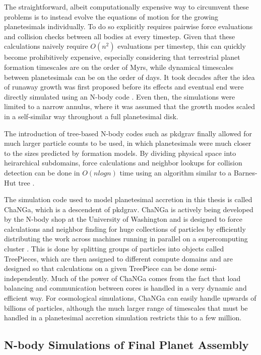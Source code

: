 The straightforward, albeit computationally expensive way to circumvent these problems is to instead evolve the equations of motion for the growing planetesimals individually. To do so explicitly requires pairwise force evaluations and collision checks between all bodies at every timestep. Given that these calculations naively require $O(n^2)$ evaluations per timestep, this can quickly become prohibitively expensive, especially considering that terrestrial planet formation timescales are on the order of Myrs, while dynamical timescales between planetesimals can be on the order of days. It took decades after the idea of runaway growth was first proposed before its effects and eventual end were directly simulated using an N-body code \cite{kokubo96, kokubo98}. Even then, the simulations were limited to a narrow annulus, where it was assumed that the growth modes scaled in a self-similar way throughout a full planetesimal disk.

The introduction of tree-based N-body codes such as {\sc pkdgrav} \cite{richardson00, stadel01, wadsley04} finally allowed for much larger particle counts to be used, in which planetesimals were much closer to the sizes predicted by formation models. By dividing physical space into heirarchical subdomains, force calculations and neighbor lookups for collision detection can be done in $O (n log n)$ time using an algorithm similar to a Barnes-Hut tree \cite{barnes86}. 

The simulation code used to model planetesimal accretion in this thesis is called {\sc ChaNGa}, which is a descendent of {\sc pkdgrav}. {\sc ChaNGa} is actively being developed by the N-body shop at the University of Washington and is designed to force calculations and neighbor finding for huge collections of particles by efficiently distributing the work across machines running in parallel on a supercomputing cluster \cite{jetley08, menon15}. This is done by splitting groups of particles into objects called TreePieces, which are then assigned to different compute domains and are designed so that calculations on a given TreePiece can be done semi-independently. Much of the power of {\sc ChaNGa} comes from the fact that load balancing and communication between cores is handled in a very dynamic and efficient way. For cosmological simulations, {\sc ChaNGa} can easily handle upwards of billions of particles, although the much larger range of timescales that must be handled in a planetesimal accretion simulation restricts this to a few million.

\subsection{N-body Simulations of Final Planet Assembly}

